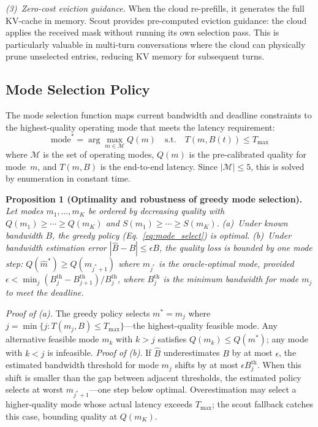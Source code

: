\documentclass[journal]{IEEEtran}
\begin{document}
\emph{(3)~Zero-cost eviction guidance.}
When the cloud re-prefills, it generates the full KV-cache in memory.
Scout provides pre-computed eviction guidance: the cloud applies the received mask without running its own selection pass.
This is particularly valuable in multi-turn conversations where the cloud can physically prune unselected entries, reducing KV memory for subsequent turns.

\subsection{Mode Selection Policy}

The mode selection function maps current bandwidth and deadline constraints to the highest-quality operating mode that meets the latency requirement:
\begin{equation}
    \text{mode}^* = \arg\max_{m \in \mathcal{M}} Q(m) \quad \text{s.t.} \quad T(m, B(t)) \leq T_{\max}
    \label{eq:mode_select}
\end{equation}
where $\mathcal{M}$ is the set of operating modes, $Q(m)$ is the pre-calibrated quality for mode~$m$, and $T(m, B)$ is the end-to-end latency.
Since $|\mathcal{M}| \leq 5$, this is solved by enumeration in constant time.

\textbf{Proposition 1 (Optimality and robustness of greedy mode selection).}
\emph{Let modes $m_1, \ldots, m_K$ be ordered by decreasing quality with $Q(m_1) \geq \cdots \geq Q(m_K)$ and $S(m_1) \geq \cdots \geq S(m_K)$.}
\emph{(a)~Under known bandwidth $B$, the greedy policy (Eq.~\ref{eq:mode_select}) is optimal.}
\emph{(b)~Under bandwidth estimation error $|\hat{B} - B| \leq \epsilon B$, the quality loss is bounded by one mode step: $Q(\hat{m}^*) \geq Q(m_{j^*+1})$ where $m_{j^*}$ is the oracle-optimal mode, provided $\epsilon < \min_{j} (B_j^{\text{th}} - B_{j+1}^{\text{th}}) / B_j^{\text{th}}$, where $B_j^{\text{th}}$ is the minimum bandwidth for mode $m_j$ to meet the deadline.}

\emph{Proof of (a).}
The greedy policy selects $m^* = m_j$ where $j = \min\{j : T(m_j, B) \leq T_{\max}\}$---the highest-quality feasible mode.
Any alternative feasible mode $m_k$ with $k > j$ satisfies $Q(m_k) \leq Q(m^*)$; any mode with $k < j$ is infeasible.
\emph{Proof of (b).}
If $\hat{B}$ underestimates $B$ by at most $\epsilon$, the estimated bandwidth threshold for mode $m_j$ shifts by at most $\epsilon B_j^{\text{th}}$.
When this shift is smaller than the gap between adjacent thresholds, the estimated policy selects at worst $m_{j^*+1}$---one step below optimal.
Overestimation may select a higher-quality mode whose actual latency exceeds $T_{\max}$; the scout fallback catches this case, bounding quality at $Q(m_K)$.
\end{document}
